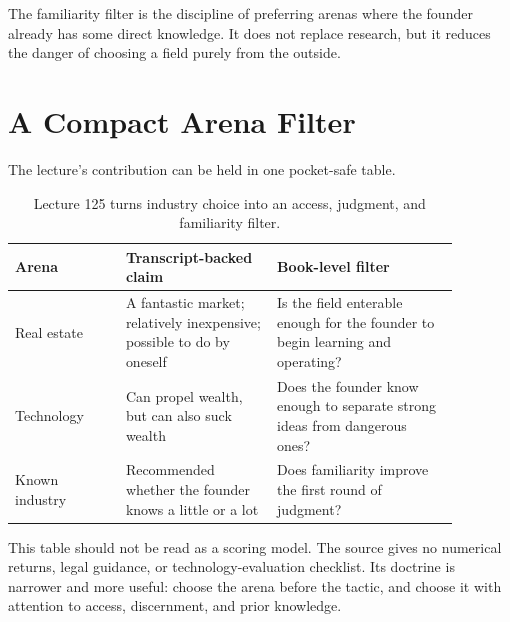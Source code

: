 \documentclass[11pt,oneside]{book}
\begin{document}
\begin{definition}
The familiarity filter is the discipline of preferring arenas where the founder already has some direct knowledge. It does not replace research, but it reduces the danger of choosing a field purely from the outside.
\end{definition}

\section{A Compact Arena Filter}

The lecture's contribution can be held in one pocket-safe table.

\begin{table}
\centering
\small
\begin{tabular}{p{0.22\linewidth} p{0.30\linewidth} p{0.36\linewidth}}
\hline
Arena & Transcript-backed claim & Book-level filter \\
\hline
Real estate & A fantastic market; relatively inexpensive; possible to do by oneself & Is the field enterable enough for the founder to begin learning and operating? \\
Technology & Can propel wealth, but can also suck wealth & Does the founder know enough to separate strong ideas from dangerous ones? \\
Known industry & Recommended whether the founder knows a little or a lot & Does familiarity improve the first round of judgment? \\
\hline
\end{tabular}
\caption{Lecture 125 turns industry choice into an access, judgment, and familiarity filter.}
\end{table}

This table should not be read as a scoring model. The source gives no numerical returns, legal guidance, or technology-evaluation checklist. Its doctrine is narrower and more useful: choose the arena before the tactic, and choose it with attention to access, discernment, and prior knowledge.

\end{document}
